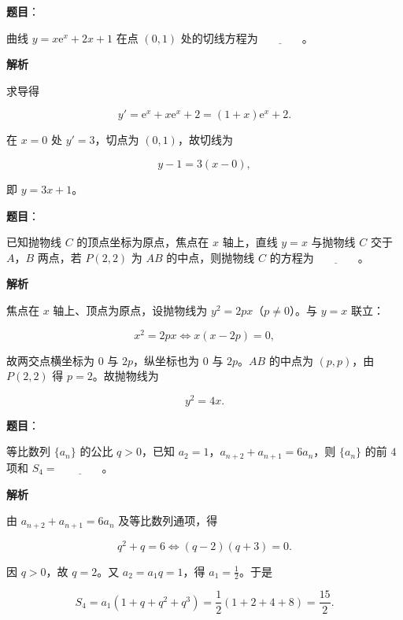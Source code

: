 \begin{answer}

\textbf{题目}：

曲线 $y=x\mathrm e^x+2x+1$ 在点 $(0,1)$ 处的切线方程为$\underline{\qquad\qquad}$。

\textbf{解析}

求导得

\nopagebreak[4]
\[y'=\mathrm e^x+x\mathrm e^x+2=(1+x)\mathrm e^x+2 .\]

在 $x=0$ 处 $y'=3$，切点为 $(0,1)$，故切线为

\nopagebreak[4]
\[y-1=3(x-0),\]

即 $y=3x+1$。


\end{answer}
\begin{answer}

\textbf{题目}：

已知抛物线 $C$ 的顶点坐标为原点，焦点在 $x$ 轴上，直线 $y=x$ 与抛物线 $C$ 交于 $A$，$B$ 两点，若 $P(2,2)$ 为 $AB$ 的中点，则抛物线 $C$ 的方程为$\underline{\qquad\qquad}$。

\textbf{解析}

焦点在 $x$ 轴上、顶点为原点，设抛物线为 $y^2=2px$（$p\neq0$）。与 $y=x$ 联立：

\nopagebreak[4]
\[x^2=2px\iff x(x-2p)=0,\]

故两交点横坐标为 $0$ 与 $2p$，纵坐标也为 $0$ 与 $2p$。$AB$ 的中点为 $(p,p)$，由 $P(2,2)$ 得 $p=2$。故抛物线为

\nopagebreak[4]
\[y^2=4x .\]


\end{answer}
\begin{answer}

\textbf{题目}：

等比数列 $\{a_n\}$ 的公比 $q>0$，已知 $a_2=1$，$a_{n+2}+a_{n+1}=6a_n$，则 $\{a_n\}$ 的前 $4$ 项和 $S_4=$$\underline{\qquad\qquad}$。

\textbf{解析}

由 $a_{n+2}+a_{n+1}=6a_n$ 及等比数列通项，得

\nopagebreak[4]
\[q^2+q=6\iff(q-2)(q+3)=0 .\]

因 $q>0$，故 $q=2$。又 $a_2=a_1q=1$，得 $a_1=\frac12$。于是

\nopagebreak[4]
\[S_4=a_1(1+q+q^2+q^3)=\frac12(1+2+4+8)=\frac{15}{2} .\]


\end{answer}

